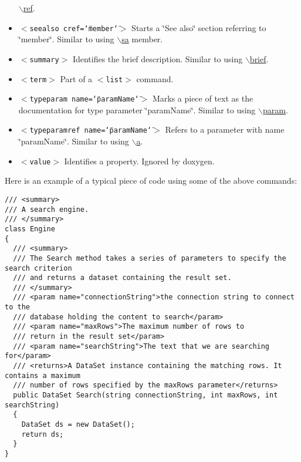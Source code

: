 \begin{itemize}
\hyperlink{commands_cmdref}{$\backslash$ref}. \item {\tt $<$seealso cref=\char`\"{}member\char`\"{}$>$} Starts a \char`\"{}See also\char`\"{} section referring to \char`\"{}member\char`\"{}. Similar to using \hyperlink{commands_cmdsa}{$\backslash$sa} member. \item {\tt $<$summary$>$} Identifies the brief description. Similar to using \hyperlink{commands_cmdbrief}{$\backslash$brief}. \item {\tt $<$term$>$} Part of a {\tt $<$list$>$} command. \item {\tt $<$typeparam name=\char`\"{}paramName\char`\"{}$>$} Marks a piece of text as the documentation for type parameter \char`\"{}paramName\char`\"{}. Similar to using \hyperlink{commands_cmdparam}{$\backslash$param}. \item {\tt $<$typeparamref name=\char`\"{}paramName\char`\"{}$>$} Refers to a parameter with name \char`\"{}paramName\char`\"{}. Similar to using \hyperlink{commands_cmda}{$\backslash$a}. \item {\tt $<$value$>$} Identifies a property. Ignored by doxygen. \end{itemize}


Here is an example of a typical piece of code using some of the above commands:



\begin{Code}\begin{verbatim}/// <summary>
/// A search engine.
/// </summary>
class Engine
{
  /// <summary>
  /// The Search method takes a series of parameters to specify the search criterion
  /// and returns a dataset containing the result set.
  /// </summary>
  /// <param name="connectionString">the connection string to connect to the
  /// database holding the content to search</param>
  /// <param name="maxRows">The maximum number of rows to
  /// return in the result set</param>
  /// <param name="searchString">The text that we are searching for</param>
  /// <returns>A DataSet instance containing the matching rows. It contains a maximum
  /// number of rows specified by the maxRows parameter</returns>
  public DataSet Search(string connectionString, int maxRows, int searchString)
  {
    DataSet ds = new DataSet();
    return ds;
  }
}
\end{verbatim}
\end{Code}

 